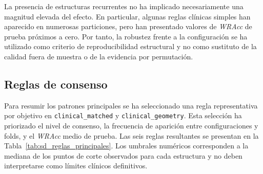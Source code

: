 La presencia de estructuras recurrentes no ha implicado necesariamente una magnitud elevada del efecto. En particular, algunas reglas clínicas simples han aparecido en numerosas particiones, pero han presentado valores de \textit{WRAcc} de prueba próximos a cero. Por tanto, la robustez frente a la configuración se ha utilizado como criterio de reproducibilidad estructural y no como sustituto de la calidad fuera de muestra o de la evidencia por permutación.

\subsection{Reglas de consenso}

Para resumir los patrones principales se ha seleccionado una regla representativa por objetivo en \texttt{clinical\_matched} y \texttt{clinical\_geometry}. Esta selección ha priorizado el nivel de consenso, la frecuencia de aparición entre configuraciones y folds, y el \textit{WRAcc} medio de prueba. Las seis reglas resultantes se presentan en la Tabla~\ref{tab:sd_reglas_principales}. Los umbrales numéricos corresponden a la mediana de los puntos de corte observados para cada estructura y no deben interpretarse como límites clínicos definitivos.

